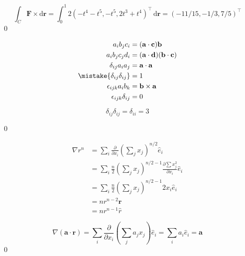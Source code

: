 \documentclass[12pt]{article}
\begin{document}
\begin{equation}
    \int_{C} \mathbf{F} \times \mathrm{d}\mathbf{r} = \int_{0}^{1} 2 (-t^{4} - t^{5}, -t^{5}, 2t^{3} + t^{4})^{\intercal} \, \mathrm{d}\mathbf{r} = (-11/15, -1/3, 7/5)^{\intercal}
\end{equation}
\qed



\begin{equation}
\begin{split}
    a_{i} b_{j} c_{i} &= (\mathbf{a} \cdot \mathbf{c}) \mathbf{b} \\
    a_{i} b_{j} c_{j} d_{i} &= (\mathbf{a} \cdot \mathbf{d}) (\mathbf{b} \cdot \mathbf{c}) \\
    \delta_{ij} a_{i} a_{j} &= \mathbf{a} \cdot \mathbf{a} \\
    \mistake{\delta_{ij} \delta_{ij}} &= 1 \\
    \epsilon_{ijk} a_{i} b_{k} &= \mathbf{b} \times \mathbf{a} \\
    \epsilon_{ijk} \delta_{ij} &= 0 \\
\end{split}
\end{equation}

\begin{correction}
    \begin{equation}
        \delta_{ij} \delta_{ij} = \delta_{ii} = 3
    \end{equation}
\end{correction}

\qed


\begin{equation}
\begin{split}
    \nabla r^{n} &= \sum_{i} \frac{\partial }{\partial x_{i}} \left( \sum_{j} x_{j} \right)^{n/2} \hat{e}_{i} \\
    &= \sum_{i} \frac{n}{2} \left( \sum_{j} x_{j} \right)^{n/2 - 1} \frac{\partial \sum x_{j}^{2}}{\partial x_{i}} \hat{e}_{i} \\
    &= \sum_{i} \frac{n}{2} \left( \sum_{j} x_{j} \right)^{n/2 - 1} 2x_{i} \hat{e}_{i} \\
    &= n r^{n-2} \mathbf{r} \\
    &= n r^{n-1} \hat{r}
\end{split}
\end{equation}

\begin{equation}
    \nabla (\mathbf{a} \cdot \mathbf{r}) = \sum_{i} \frac{\partial }{\partial x_{i}} \left( \sum_{j} a_{j} x_{j} \right) \hat{e}_{i} = \sum_{i} a_{i} \hat{e}_{i} = \mathbf{a}
\end{equation}
\qed
\end{document}
